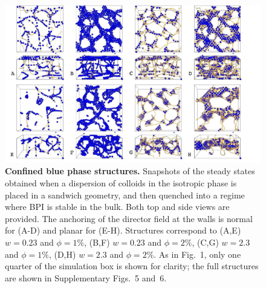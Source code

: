 \documentclass[12pt]{article}
\begin{document}
\begin{figure}
\centerline{\includegraphics[width=\textwidth]{text-fig2.jpg}}
\caption{\textbf{Confined blue phase structures.}
Snapshots of the steady states obtained when a dispersion of colloids in the isotropic phase is placed in a sandwich geometry, 
and then quenched into a regime where BPI is stable in the bulk. Both top and side views are provided.
The anchoring of the director field at the walls is normal for (A-D) and planar for (E-H). 
Structures correspond to (A,E) $w=0.23$ and $\phi=1\%$, 
(B,F) $w=0.23$ and $\phi=2\%$, 
(C,G) $w=2.3$ and $\phi=1\%$,
(D,H) $w=2.3$ and $\phi=2\%$.
As in Fig.~1, only one quarter of the simulation box is shown for clarity;
the full structures are shown in Supplementary Figs.~5 and~6.}
\end{figure}
\end{document}
